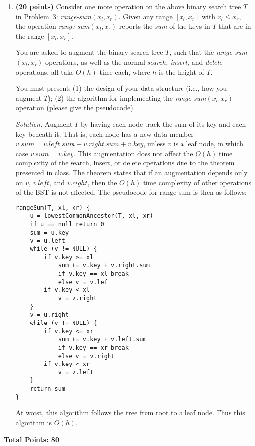 \documentclass[11pt]{article}
\begin{document}
\begin{enumerate}
\item
{\bf (20 points)}
Consider one more operation on the above binary search tree $T$ in Problem~3: {\em range-sum}$(x_l,x_r)$. Given any range $[x_l,x_r]$ with $x_l\leq x_r$,  the operation {\em range-sum}$(x_l,x_r)$ reports the {\em sum} of the keys in $T$ that are in the range $[x_l,x_r]$.

You are asked to augment the binary search tree $T$, such that the {\em range-sum}$(x_l,x_r)$ operations, as well as the normal {\em search, insert}, and {\em delete} operations, all take $O(h)$ time each, where $h$ is the height of $T$.

You must present: (1) the design of your data structure (i.e., how you augment $T$); (2) the algorithm for implementing the {\em range-sum}$(x_l,x_r)$ operation (please give the pseudocode).

\textit{Solution:} Augment $T$ by having each node track the sum of its key and each key beneath it. That is, each node has a new data member $v.sum = v.left.sum + v.right.sum + v.key$, unless $v$ is a leaf node, in which case $v.sum = v.key$. This augmentation does not affect the $O(h)$ time complexity of the search, insert, or delete operations due to the theorem presented in class. The theorem states that if an augmentation depends only on $v$, $v.left$, and $v.right$, then the $O(h)$ time complexity of other operations of the BST is not affected. The pseudocode for range-sum is then as follows:
\begin{verbatim}
rangeSum(T, xl, xr) {
    u = lowestCommonAncestor(T, xl, xr)
    if u == null return 0
    sum = u.key
    v = u.left
    while (v != NULL) {
        if v.key >= xl
            sum += v.key + v.right.sum
            if v.key == xl break
            else v = v.left
        if v.key < xl
            v = v.right
    }
    v = u.right
    while (v != NULL) {
        if v.key <= xr
            sum += v.key + v.left.sum
            if v.key == xr break
            else v = v.right
        if v.key < xr
            v = v.left
    }
    return sum
}
\end{verbatim}
At worst, this algorithm follows the tree from root to a leaf node. Thus this algorithm is $O(h)$.
\end{enumerate}
{\bf Total Points: 80}
\end{document}
